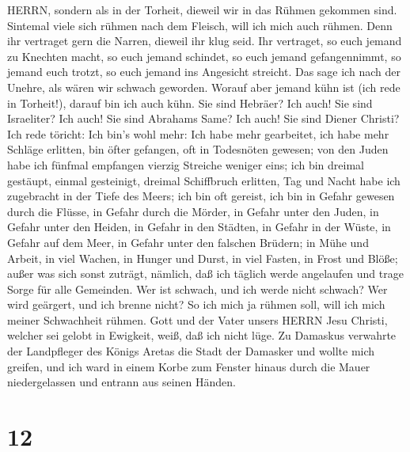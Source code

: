 HERRN, sondern als in der Torheit, dieweil wir in das Rühmen gekommen
sind.  Sintemal viele sich rühmen nach dem Fleisch, will
ich mich auch rühmen.  Denn ihr vertraget gern die Narren,
dieweil ihr klug seid.  Ihr vertraget, so euch jemand zu
Knechten macht, so euch jemand schindet, so euch jemand gefangennimmt,
so jemand euch trotzt, so euch jemand ins Angesicht streicht.
 Das sage ich nach der Unehre, als wären wir schwach
geworden. Worauf aber jemand kühn ist (ich rede in Torheit!), darauf bin
ich auch kühn.  Sie sind Hebräer? Ich auch! Sie sind
Israeliter? Ich auch! Sie sind Abrahams Same? Ich auch! 
Sie sind Diener Christi? Ich rede töricht: Ich bin's wohl mehr: Ich habe
mehr gearbeitet, ich habe mehr Schläge erlitten, bin öfter gefangen, oft
in Todesnöten gewesen;  von den Juden habe ich fünfmal
empfangen vierzig Streiche weniger eins;  ich bin dreimal
gestäupt, einmal gesteinigt, dreimal Schiffbruch erlitten, Tag und Nacht
habe ich zugebracht in der Tiefe des Meers;  ich bin oft
gereist, ich bin in Gefahr gewesen durch die Flüsse, in Gefahr durch die
Mörder, in Gefahr unter den Juden, in Gefahr unter den Heiden, in Gefahr
in den Städten, in Gefahr in der Wüste, in Gefahr auf dem Meer, in
Gefahr unter den falschen Brüdern;  in Mühe und Arbeit, in
viel Wachen, in Hunger und Durst, in viel Fasten, in Frost und Blöße;
 außer was sich sonst zuträgt, nämlich, daß ich täglich
werde angelaufen und trage Sorge für alle Gemeinden.  Wer
ist schwach, und ich werde nicht schwach? Wer wird geärgert, und ich
brenne nicht?  So ich mich ja rühmen soll, will ich mich
meiner Schwachheit rühmen.  Gott und der Vater unsers HERRN
Jesu Christi, welcher sei gelobt in Ewigkeit, weiß, daß ich nicht lüge.
 Zu Damaskus verwahrte der Landpfleger des Königs Aretas
die Stadt der Damasker und wollte mich greifen,  und ich
ward in einem Korbe zum Fenster hinaus durch die Mauer niedergelassen
und entrann aus seinen Händen.

\hypertarget{section-11}{%
\section{12}\label{section-11}}

